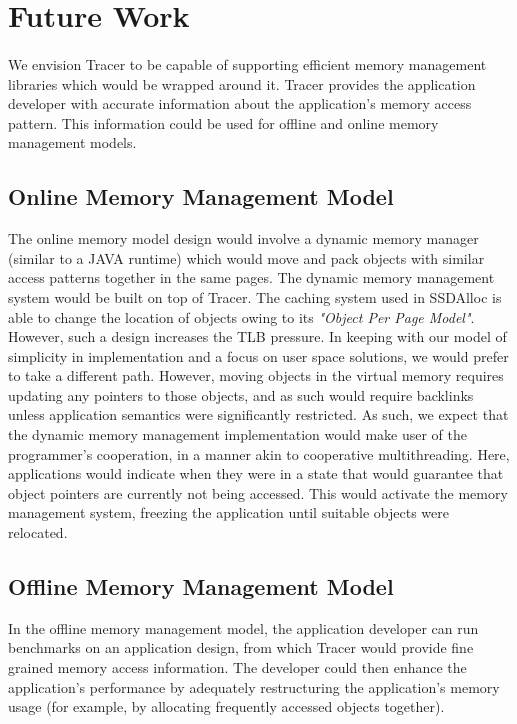 \section{Future Work}
\label{sec:futurework}
\paragraph{}
We envision Tracer to be capable of supporting efficient memory management libraries which would be wrapped around it. Tracer provides the application developer with accurate information about the application's memory access pattern. This information could be used for offline and online memory management models.

\subsection{Online Memory Management Model}
The online memory model design would involve a dynamic memory manager (similar to a JAVA runtime) which would move and pack objects with similar access patterns together in the same pages. The dynamic memory management system would be built on top of Tracer. The caching system used in SSDAlloc is able to change the location of objects owing to its {\emph{"Object Per Page Model"}}. However, such a design increases the TLB pressure. In keeping with our model of simplicity in implementation and a focus on user space solutions, we would prefer to take a different path. However, moving objects in the virtual memory requires updating any pointers to those objects, and as such would require backlinks unless application semantics were significantly restricted. As such, we expect that the dynamic memory management implementation would make user of the programmer's cooperation, in a manner akin to cooperative multithreading. Here, applications would indicate when they were in a state that would guarantee that object pointers are currently not being accessed. This would activate the memory management system, freezing the application until suitable objects were relocated.

\subsection{Offline Memory Management Model}
In the offline memory management model, the application developer can run benchmarks on an application design, from which Tracer would provide fine grained memory access information. The developer could then enhance the application's performance by adequately restructuring the application's memory usage (for example, by allocating frequently accessed objects together).

